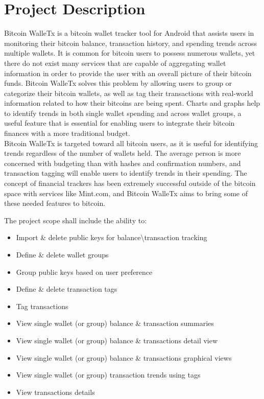 \documentclass[12pt]{article}
\begin{document}
  \section{Project Description}
  \begin{adjustwidth}{1.5em}{0pt}

  \normalsize{Bitcoin WalleTx is a bitcoin wallet tracker tool for Android that assists users in monitoring their bitcoin balance, transaction history, and spending trends across multiple wallets. It is common for bitcoin users to possess numerous wallets, yet there do not exist many services that are capable of aggregating wallet information in order to provide the user with an overall picture of their bitcoin funds. Bitcoin WalleTx solves this problem by allowing users to group or categorize their bitcoin wallets, as well as tag their transactions with real-world information related to how their bitcoins are being spent. Charts and graphs help to identify trends in both single wallet spending and across wallet groups, a useful feature that is essential for enabling users to integrate their bitcoin finances with a more traditional budget.}\\

  \normalsize{Bitcoin WalleTx is targeted toward all bitcoin users, as it is useful for identifying trends regardless of the number of wallets held. The average person is more concerned with budgeting than with hashes and confirmation numbers, and transaction tagging will enable users to identify trends in their spending. The concept of financial trackers has been extremely successful outside of the bitcoin space with services like Mint.com, and Bitcoin WalleTx aims to bring some of these needed features to bitcoin.}\\
  \end{adjustwidth}

  \normalsize{The project scope shall include the ability to:}\\ 
  
  \begin{adjustwidth}{1.5em}{0pt}
    \begin{itemize}
      \item Import \& delete public keys for balance\textbackslash{transaction} tracking
      \item Define \& delete wallet groups
      \item Group public keys based on user preference
      \item Define \& delete transaction tags
      \item Tag transactions
      \item View single wallet (or group) balance \& transaction summaries
      \item View single wallet (or group) balance \& transactions detail view
      \item View single wallet (or group) balance \& transactions graphical views
      \item View single wallet (or group) transaction trends using tags
      \item View transactions details

    \end{itemize}
  \end{adjustwidth}
\end{document}
